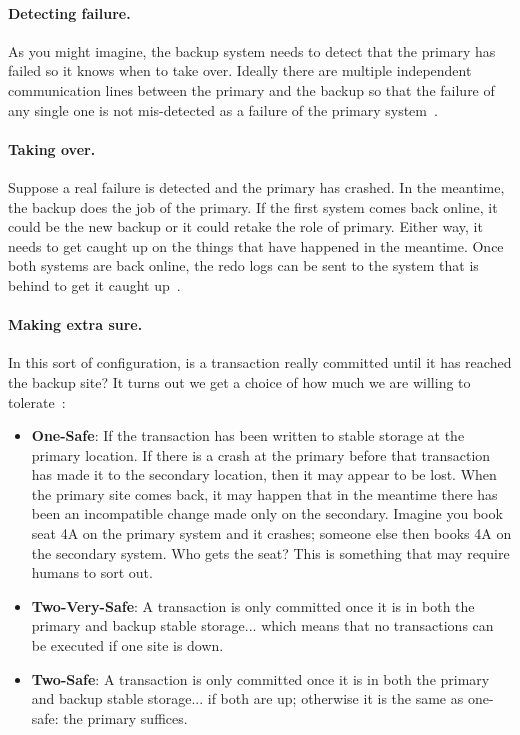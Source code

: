 \paragraph{Detecting failure.} As you might imagine, the backup system needs to detect that the primary has failed so it knows when to take over. Ideally there are multiple independent communication lines between the primary and the backup so that the failure of any single one is not mis-detected as a failure of the primary system~\cite{dsc}.

\paragraph{Taking over.} Suppose a real failure is detected and the primary has crashed. In the meantime, the backup does the job of the primary. If the first system comes back online, it could be the new backup or it could retake the role of primary. Either way, it needs to get caught up on the things that have happened in the meantime. Once both systems are back online, the redo logs can be sent to the system that is behind to get it caught up~\cite{dsc}.

\paragraph{Making extra sure.} In this sort of configuration, is a transaction really committed until it has reached the backup site? It turns out we get a choice of how much we are willing to tolerate~\cite{dsc}:

\begin{itemize}
	\item \textbf{One-Safe}: If the transaction has been written to stable storage at the primary location. If there is a crash at the primary before that transaction has made it to the secondary location, then it may appear to be lost. When the primary site comes back, it may happen that in the meantime there has been an incompatible change made only on the secondary. Imagine you book seat 4A on the primary system and it crashes; someone else then books 4A on the secondary system. Who gets the seat? This is something that may require humans to sort out.
	\item \textbf{Two-Very-Safe}: A transaction is only committed once it is in both the primary and backup stable storage... which means that no transactions can be executed if one site is down.
	\item \textbf{Two-Safe}: A transaction is only committed once it is in both the primary and backup stable storage... if both are up; otherwise it is the same as one-safe: the primary suffices. 
\end{itemize}

